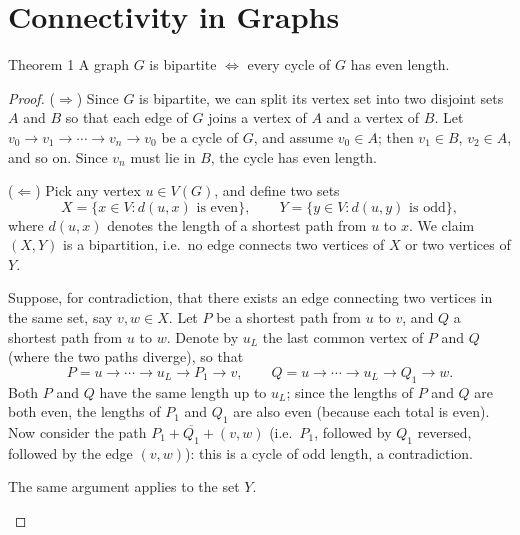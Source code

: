 \section{Connectivity in Graphs}

\begin{thmbox}{Theorem 1}
A graph $G$ is bipartite $\iff$ every cycle of $G$ has even length.
\end{thmbox}

\begin{proof}
($\Rightarrow$) Since $G$ is bipartite, we can split its vertex set into two disjoint sets $A$ and $B$ so that each edge of $G$ joins a vertex of $A$ and a vertex of $B$. Let $v_0 \to v_1 \to \cdots \to v_n \to v_0$ be a cycle of $G$, and assume $v_0 \in A$; then $v_1 \in B$, $v_2 \in A$, and so on. Since $v_n$ must lie in $B$, the cycle has even length.

\medskip
\noindent ($\Leftarrow$) Pick any vertex $u \in V(G)$, and define two sets
$$X = \{x \in V : d(u,x) \text{ is even}\}, \qquad Y = \{y \in V : d(u,y) \text{ is odd}\},$$
where $d(u,x)$ denotes the length of a shortest path from $u$ to $x$. We claim $(X,Y)$ is a bipartition, i.e.\ no edge connects two vertices of $X$ or two vertices of $Y$.

Suppose, for contradiction, that there exists an edge connecting two vertices in the same set, say $v, w \in X$. Let $P$ be a shortest path from $u$ to $v$, and $Q$ a shortest path from $u$ to $w$. Denote by $u_L$ the last common vertex of $P$ and $Q$ (where the two paths diverge), so that
$$P = u \to \cdots \to u_L \to P_1 \to v, \qquad Q = u \to \cdots \to u_L \to Q_1 \to w.$$
Both $P$ and $Q$ have the same length up to $u_L$; since the lengths of $P$ and $Q$ are both even, the lengths of $P_1$ and $Q_1$ are also even (because each total is even). Now consider the path $P_1 + \overline{Q_1} + (v,w)$ (i.e.\ $P_1$, followed by $Q_1$ reversed, followed by the edge $(v,w)$): this is a cycle of odd length, a contradiction.

The same argument applies to the set $Y$.

\begin{center}
\end{center}
\end{proof}

